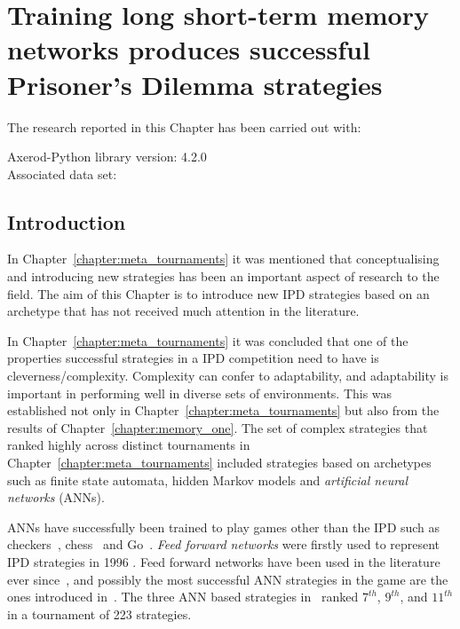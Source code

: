 \chapter{Training long short-term memory networks produces successful Prisoner's Dilemma strategies}\label{chapter:lstm}

\begin{center}
    The research reported in this Chapter has been carried out with:

    Axerod-Python library version: 4.2.0 \\
    Associated data set: \\ \vspace{.5cm} %
\end{center}

\hrulefill

\section{Introduction}

In Chapter~\ref{chapter:meta_tournaments} it was mentioned that conceptualising
and introducing new strategies has been an important aspect of research to the
field. The aim of this Chapter is to introduce new IPD strategies based on an
archetype that has not received much attention in the literature.

In Chapter~\ref{chapter:meta_tournaments} it was concluded that one of the
properties successful strategies in a IPD competition need to have is
cleverness/complexity. Complexity can confer to adaptability, and adaptability
is important in performing well in diverse sets of environments. This was
established not only in Chapter~\ref{chapter:meta_tournaments} but also from the
results of Chapter~\ref{chapter:memory_one}. The set of complex strategies that
ranked highly across distinct tournaments in
Chapter~\ref{chapter:meta_tournaments} included strategies based on archetypes
such as finite state automata, hidden Markov models and \textit{artificial
neural networks} (ANNs).

ANNs have successfully been trained to play games other than the IPD such as
checkers~\cite{Chellapilla1999}, chess~\cite{Fogel2004} and
Go~\cite{Silver2016}. \textit{Feed forward networks} were firstly used to represent IPD
strategies in 1996 \cite{Harrald1996}. Feed forward networks have been used in
the literature ever since~\cite{Ashlock2008, Ashlock2006a, Darwen2001,
Franken2005}, and possibly the most successful ANN strategies in the game are
the ones introduced in~\cite{Harper2017}. The three ANN based strategies
in~\cite{Harper2017} ranked \(7^{th}\), \(9^{th}\), and \(11^{th}\) in a
tournament of 223 strategies.

